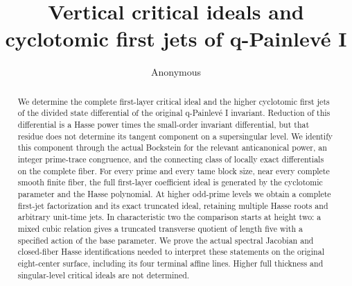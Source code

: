 \documentclass[11pt,letterpaper]{article}
\title{Vertical critical ideals and cyclotomic first jets of q-Painlev\'e I}
\author{Anonymous}
\date{}
\begin{document}
\maketitle
\begin{abstract}
We determine the complete first-layer critical ideal and the higher
cyclotomic first jets of the divided state differential of the original
q-Painlev\'e I invariant. Reduction of this differential is a Hasse
power times the small-order invariant differential, but that residue
does not determine its tangent component on a supersingular level.
We identify this component through the actual Bockstein for the
relevant anticanonical power, an integer prime-trace congruence, and the
connecting class of locally exact differentials on the complete fiber.
For every prime and every tame block size, near every complete smooth
finite fiber, the full first-layer coefficient ideal is generated by
the cyclotomic parameter and the Hasse polynomial. At higher odd-prime levels we obtain a complete
first-jet factorization and its exact truncated ideal, retaining
multiple Hasse roots and arbitrary unit-time jets. In characteristic
two the comparison starts at height two: a mixed cubic relation gives
a truncated transverse quotient of length five with a specified action
of the base parameter. We prove the actual spectral Jacobian and
closed-fiber Hasse identifications needed to interpret these statements
on the original eight-center surface, including its four terminal
affine lines. Higher full thickness and singular-level critical ideals
are not determined.
\end{abstract}










\label{LastBodyPage}
\clearpage


\end{document}
